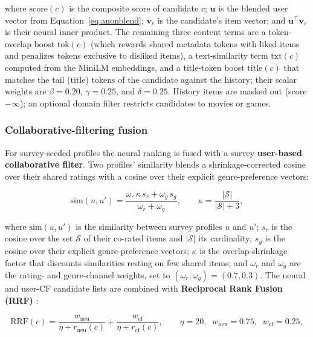 where $\mathrm{score}(c)$ is the composite score of candidate $c$; $\mathbf{u}$ is the blended user vector from Equation~\eqref{eq:anonblend}; $\mathbf{v}_c$ is the candidate's item vector; and $\mathbf{u}^{\top}\mathbf{v}_c$ is their neural inner product. The remaining three content terms are a token-overlap boost $\mathrm{tok}(c)$ (which rewards shared metadata tokens with liked items and penalizes tokens exclusive to disliked items), a text-similarity term $\mathrm{txt}(c)$ computed from the MiniLM embeddings, and a title-token boost $\mathrm{title}(c)$ that matches the tail (title) tokens of the candidate against the history; their scalar weights are $\beta = 0.20$, $\gamma = 0.25$, and $\delta = 0.25$. History items are masked out (score $-\infty$); an optional domain filter restricts candidates to movies or games.

\subsubsection{Collaborative-filtering fusion}
For survey-seeded profiles the neural ranking is fused with a survey \textbf{user-based collaborative filter}. Two profiles' similarity blends a shrinkage-corrected cosine over their shared ratings with a cosine over their explicit genre-preference vectors:

\begin{equation}
\mathrm{sim}(u,u') = \frac{\omega_r\,\kappa\,s_r + \omega_g\,s_g}{\omega_r + \omega_g},
\qquad
\kappa = \frac{|\mathcal{S}|}{|\mathcal{S}| + 3},
\label{eq:usercf}
\end{equation}

where $\mathrm{sim}(u,u')$ is the similarity between survey profiles $u$ and $u'$; $s_r$ is the cosine over the set $\mathcal{S}$ of their co-rated items and $|\mathcal{S}|$ its cardinality; $s_g$ is the cosine over their explicit genre-preference vectors; $\kappa$ is the overlap-shrinkage factor that discounts similarities resting on few shared items; and $\omega_r$ and $\omega_g$ are the rating- and genre-channel weights, set to $(\omega_r,\omega_g) = (0.7, 0.3)$. The neural and user-CF candidate lists are combined with \textbf{Reciprocal Rank Fusion (RRF)} \cite{cormack2009rrf}:

\begin{equation}
\mathrm{RRF}(c) = \frac{w_{\text{neu}}}{\eta + r_{\text{neu}}(c)} + \frac{w_{\text{cf}}}{\eta + r_{\text{cf}}(c)},
\qquad \eta = 20,\;\; w_{\text{neu}} = 0.75,\;\; w_{\text{cf}} = 0.25,
\label{eq:rrf}
\end{equation}

